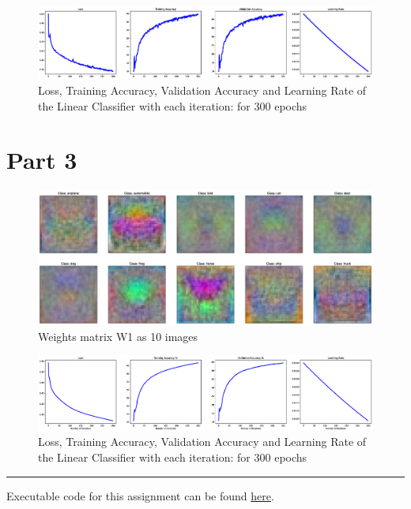 \documentclass[a4paper,11pt]{article}%
\begin{document}
\begin{figure}[!h]
	\centering
	\includegraphics[scale=0.25]{figures/part2plots}
	\caption{Loss, Training Accuracy, Validation Accuracy and Learning Rate of the Linear Classifier with each iteration: for 300 epochs}
\end{figure}

\pagebreak
\section{Part 3}

\begin{figure}[!h]
	\centering
	\includegraphics[scale=0.3]{figures/trainedWeightsnn2stochastic}
	\caption{Weights matrix W1 as 10 images}
\end{figure}

\begin{figure}[!h]
	\centering
	\includegraphics[scale=0.25]{figures/part3plots}
	\caption{Loss, Training Accuracy, Validation Accuracy and Learning Rate of the Linear Classifier with each iteration: for 300 epochs}
\end{figure}

\vfill
\hrule
\begin{center}
	Executable code for this assignment can be found  \href{https://github.com/bimalka98/Computer-Vision-and-Image-Processing/blob/main/EN2550Assignments/A4/180631J_a04.ipynb}{here}.
\end{center}
  
\end{document}
